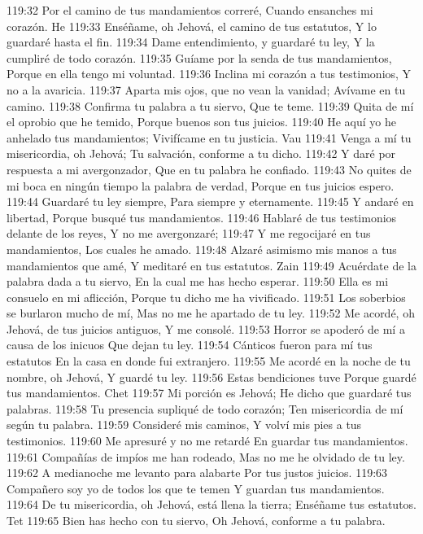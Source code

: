 119:32 Por el camino de tus mandamientos correré, 
Cuando ensanches mi corazón. 
He 
119:33 Enséñame, oh Jehová, el camino de tus estatutos, 
Y lo guardaré hasta el fin. 
119:34 Dame entendimiento, y guardaré tu ley, 
Y la cumpliré de todo corazón. 
119:35 Guíame por la senda de tus mandamientos, 
Porque en ella tengo mi voluntad. 
119:36 Inclina mi corazón a tus testimonios, 
Y no a la avaricia. 
119:37 Aparta mis ojos, que no vean la vanidad; 
Avívame en tu camino. 
119:38 Confirma tu palabra a tu siervo, 
Que te teme. 
119:39 Quita de mí el oprobio que he temido, 
Porque buenos son tus juicios. 
119:40 He aquí yo he anhelado tus mandamientos; 
Vivifícame en tu justicia. 
Vau 
119:41 Venga a mí tu misericordia, oh Jehová; 
Tu salvación, conforme a tu dicho. 
119:42 Y daré por respuesta a mi avergonzador, 
Que en tu palabra he confiado. 
119:43 No quites de mi boca en ningún tiempo la palabra de verdad, 
Porque en tus juicios espero. 
119:44 Guardaré tu ley siempre, 
Para siempre y eternamente. 
119:45 Y andaré en libertad, 
Porque busqué tus mandamientos. 
119:46 Hablaré de tus testimonios delante de los reyes, 
Y no me avergonzaré; 
119:47 Y me regocijaré en tus mandamientos, 
Los cuales he amado. 
119:48 Alzaré asimismo mis manos a tus mandamientos que amé, 
Y meditaré en tus estatutos. 
Zain 
119:49 Acuérdate de la palabra dada a tu siervo, 
En la cual me has hecho esperar. 
119:50 Ella es mi consuelo en mi aflicción, 
Porque tu dicho me ha vivificado. 
119:51 Los soberbios se burlaron mucho de mí, 
Mas no me he apartado de tu ley. 
119:52 Me acordé, oh Jehová, de tus juicios antiguos, 
Y me consolé. 
119:53 Horror se apoderó de mí a causa de los inicuos 
Que dejan tu ley. 
119:54 Cánticos fueron para mí tus estatutos 
En la casa en donde fui extranjero. 
119:55 Me acordé en la noche de tu nombre, oh Jehová, 
Y guardé tu ley. 
119:56 Estas bendiciones tuve 
Porque guardé tus mandamientos. 
Chet 
119:57 Mi porción es Jehová; 
He dicho que guardaré tus palabras. 
119:58 Tu presencia supliqué de todo corazón; 
Ten misericordia de mí según tu palabra. 
119:59 Consideré mis caminos, 
Y volví mis pies a tus testimonios. 
119:60 Me apresuré y no me retardé 
En guardar tus mandamientos. 
119:61 Compañías de impíos me han rodeado, 
Mas no me he olvidado de tu ley. 
119:62 A medianoche me levanto para alabarte 
Por tus justos juicios. 
119:63 Compañero soy yo de todos los que te temen 
Y guardan tus mandamientos. 
119:64 De tu misericordia, oh Jehová, está llena la tierra; 
Enséñame tus estatutos. 
Tet 
119:65 Bien has hecho con tu siervo, 
Oh Jehová, conforme a tu palabra. 
